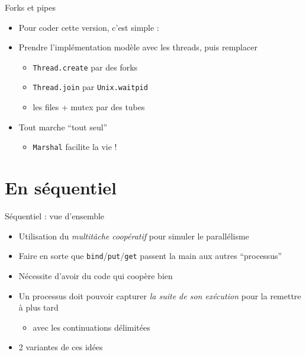 \documentclass[xetex]{beamer}
\begin{document}
\begin{frame}{Forks et pipes}
  \begin{itemize}
  \item Pour coder cette version, c'est simple :
  \item Prendre l'implémentation modèle avec les threads, puis remplacer
    \begin{itemize}
    \item \texttt{Thread.create} par des forks
    \item \texttt{Thread.join} par \texttt{Unix.waitpid}
    \item les files + mutex par des tubes
    \end{itemize}
  \item Tout marche ``tout seul''
    \begin{itemize}
    \item \texttt{Marshal} facilite la vie !
    \end{itemize}
  \end{itemize}
\end{frame}



\section{En séquentiel}

\begin{frame}[c]
  \begin{center}
    \Huge \insertsection
  \end{center}
\end{frame}
\begin{frame}{Séquentiel : vue d'ensemble}
  \begin{itemize}
  \item Utilisation du \emph{multitâche coopératif} pour simuler
    le parallélisme
  \item Faire en sorte que \texttt{bind}/\texttt{put}/\texttt{get}
    passent la main aux autres ``processus''
  \item Nécessite d'avoir du code qui coopère bien
  \item Un processus doit pouvoir capturer \emph{la suite de son exécution}
    pour la remettre à plus tard
    \begin{itemize}
    \item avec les continuations délimitées
    \end{itemize}
  \item 2 variantes de ces idées
  \end{itemize}
\end{frame}
\end{document}
